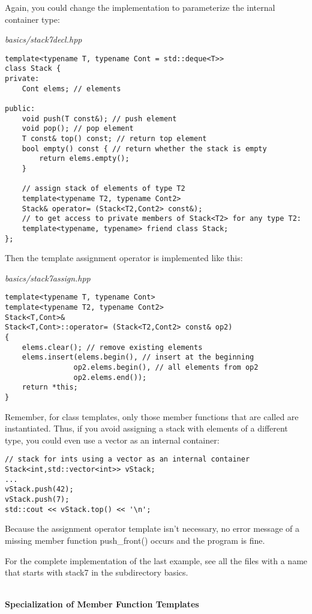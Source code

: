 Again, you could change the implementation to parameterize the internal container type:

\noindent
\textit{basics/stack7decl.hpp}
\begin{lstlisting}[style=styleCXX]
template<typename T, typename Cont = std::deque<T>>
class Stack {
private:
	Cont elems; // elements
	
public:
	void push(T const&); // push element
	void pop(); // pop element
	T const& top() const; // return top element
	bool empty() const { // return whether the stack is empty
		return elems.empty();
	}

	// assign stack of elements of type T2
	template<typename T2, typename Cont2>
	Stack& operator= (Stack<T2,Cont2> const&);
	// to get access to private members of Stack<T2> for any type T2:
	template<typename, typename> friend class Stack;
};
\end{lstlisting}

Then the template assignment operator is implemented like this:

\noindent
\textit{basics/stack7assign.hpp}
\begin{lstlisting}[style=styleCXX]
template<typename T, typename Cont>
template<typename T2, typename Cont2>
Stack<T,Cont>&
Stack<T,Cont>::operator= (Stack<T2,Cont2> const& op2)
{
	elems.clear(); // remove existing elements
	elems.insert(elems.begin(), // insert at the beginning
				op2.elems.begin(), // all elements from op2
				op2.elems.end());
	return *this;
}
\end{lstlisting}

Remember, for class templates, only those member functions that are called are instantiated. Thus, if you avoid assigning a stack with elements of a different type, you could even use a vector as an internal container:

\begin{lstlisting}[style=styleCXX]
// stack for ints using a vector as an internal container
Stack<int,std::vector<int>> vStack;
...
vStack.push(42);
vStack.push(7);
std::cout << vStack.top() << '\n';
\end{lstlisting}

Because the assignment operator template isn’t necessary, no error message of a missing member function push\_front() occurs and the program is fine.

For the complete implementation of the last example, see all the files with a name that starts with stack7 in the subdirectory basics.

\hspace*{\fill} \\ %
\noindent
\textbf{Specialization of Member Function Templates}

